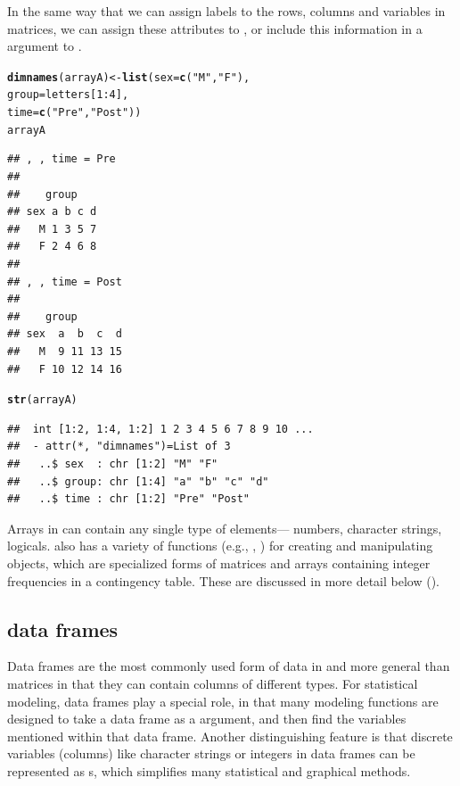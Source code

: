 \documentclass[11pt]{book}\usepackage[]{graphicx}\usepackage[]{color}
\makeatletter
\newcommand{\hlnum}[1]{\textcolor[rgb]{0.686,0.059,0.569}{#1}}%
\newcommand{\hlstr}[1]{\textcolor[rgb]{0.192,0.494,0.8}{#1}}%
\newcommand{\hlopt}[1]{\textcolor[rgb]{0,0,0}{#1}}%
\newcommand{\hlstd}[1]{\textcolor[rgb]{0.345,0.345,0.345}{#1}}%
\newcommand{\hlkwb}[1]{\textcolor[rgb]{0.69,0.353,0.396}{#1}}%
\newcommand{\hlkwc}[1]{\textcolor[rgb]{0.333,0.667,0.333}{#1}}%
\newcommand{\hlkwd}[1]{\textcolor[rgb]{0.737,0.353,0.396}{\textbf{#1}}}%
\newenvironment{kframe}{%
 \def\at@end@of@kframe{}%
 \ifinner\ifhmode%
  \def\at@end@of@kframe{\end{minipage}}%
  \begin{minipage}{\columnwidth}%
 \fi\fi%
 \def\FrameCommand##1{\hskip\@totalleftmargin \hskip-\fboxsep
 \colorbox{shadecolor}{##1}\hskip-\fboxsep
     \hskip-\linewidth \hskip-\@totalleftmargin \hskip\columnwidth}%
 \MakeFramed {\advance\hsize-\width
   \@totalleftmargin\z@ \linewidth\hsize
   \@setminipage}}%
 {\par\unskip\endMakeFramed%
 \at@end@of@kframe}
\newenvironment{knitrout}{}{} %
\renewenvironment{knitrout}{\small\renewcommand{\baselinestretch}{.85}}{} %
\makeatother
\begin{document}
In the same way that we can assign labels to the rows, columns and variables
in matrices, we can assign these attributes to , or
include this information in a  argument to .

\begin{knitrout}
\color{fgcolor}\begin{kframe}
\begin{alltt}
\hlkwd{dimnames}\hlstd{(arrayA)} \hlkwb{<-} \hlkwd{list}\hlstd{(}\hlkwc{sex}\hlstd{=}\hlkwd{c}\hlstd{(}\hlstr{"M"}\hlstd{,} \hlstr{"F"}\hlstd{),}
                         \hlkwc{group}\hlstd{=letters[}\hlnum{1}\hlopt{:}\hlnum{4}\hlstd{],}
                         \hlkwc{time}\hlstd{=}\hlkwd{c}\hlstd{(}\hlstr{"Pre"}\hlstd{,} \hlstr{"Post"}\hlstd{))}
\hlstd{arrayA}
\end{alltt}
\begin{verbatim}
## , , time = Pre
## 
##    group
## sex a b c d
##   M 1 3 5 7
##   F 2 4 6 8
## 
## , , time = Post
## 
##    group
## sex  a  b  c  d
##   M  9 11 13 15
##   F 10 12 14 16
\end{verbatim}
\begin{alltt}
\hlkwd{str}\hlstd{(arrayA)}
\end{alltt}
\begin{verbatim}
##  int [1:2, 1:4, 1:2] 1 2 3 4 5 6 7 8 9 10 ...
##  - attr(*, "dimnames")=List of 3
##   ..$ sex  : chr [1:2] "M" "F"
##   ..$ group: chr [1:4] "a" "b" "c" "d"
##   ..$ time : chr [1:2] "Pre" "Post"
\end{verbatim}
\end{kframe}
\end{knitrout}

Arrays in \R can contain any single type of elements--- numbers,
character strings, logicals.  \R also has a variety of functions
(e.g., , )
for creating and manipulating  objects, which are 
specialized forms of matrices and arrays containing integer
frequencies in a contingency table. These are discussed in more
detail below ().

\subsection{data frames}\label{sec:data-frames}
Data frames are the most commonly used form of data in \R and more
general than matrices in that they can contain columns of different types.
For statistical modeling, data frames play a special role, in that
many modeling functions are designed to take a data frame as a
 argument, and then find the variables mentioned within
that data frame. Another distinguishing feature is that discrete variables
(columns) like character strings  or integers 
in data frames can be represented as s, which simplifies
many statistical and graphical methods.
\end{document}
